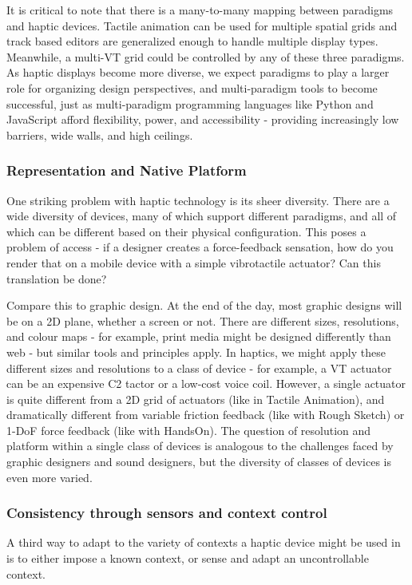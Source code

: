 It is critical to note that there is a many-to-many mapping between paradigms and haptic devices.
Tactile animation can be used for multiple spatial grids and track based editors are generalized enough to handle multiple display types.
Meanwhile, a multi-VT grid could be controlled by any of these three paradigms.
As haptic displays become more diverse, we expect paradigms to play a larger role for organizing design perspectives, and multi-paradigm tools to become successful, just as multi-paradigm programming languages like Python and JavaScript afford flexibility, power, and accessibility - providing increasingly low barriers, wide walls, and high ceilings.


\subsubsection{Representation and Native Platform}
One striking problem with haptic technology is its sheer diversity.
There are a wide diversity of devices, many of which support different paradigms, and all of which can be different based on their physical configuration.
This poses a problem of access - if a designer creates a force-feedback sensation, how do you render that on a mobile device with a simple vibrotactile actuator?
Can this translation be done?

Compare this to graphic design.
At the end of the day, most graphic designs will be on a 2D plane, whether a screen or not.
There are different sizes, resolutions, and colour maps - for example, print media might be designed differently than web - but similar tools and principles apply.
In haptics, we might apply these different sizes and resolutions to a class of device - for example, a VT actuator can be an expensive C2 tactor or a low-cost voice coil.
However, a single actuator is quite different from a 2D grid of actuators (like in Tactile Animation), and dramatically different from variable friction feedback (like with Rough Sketch) or 1-DoF force feedback (like with HandsOn).
The question of resolution and platform within a single class of devices is analogous to the challenges faced by graphic designers and sound designers, but the diversity of classes of devices is even more varied.

\subsubsection{Consistency through sensors and context control}
A third way to adapt to the variety of contexts a haptic device might be used in is to either impose a known context, or sense and adapt an uncontrollable context.

